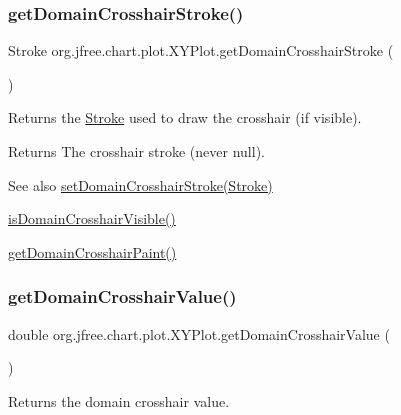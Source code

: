 \subsubsection{\texorpdfstring{get\+Domain\+Crosshair\+Stroke()}{getDomainCrosshairStroke()}}
{\footnotesize\ttfamily Stroke org.\+jfree.\+chart.\+plot.\+X\+Y\+Plot.\+get\+Domain\+Crosshair\+Stroke (\begin{DoxyParamCaption}{ }\end{DoxyParamCaption})}

Returns the \mbox{\hyperlink{}{Stroke}} used to draw the crosshair (if visible).

\begin{DoxyReturn}{Returns}
The crosshair stroke (never {\ttfamily null}).
\end{DoxyReturn}
\begin{DoxySeeAlso}{See also}
\mbox{\hyperlink{classorg_1_1jfree_1_1chart_1_1plot_1_1_x_y_plot_a6807ab7e31a792322c7fc3a3d387df77}{set\+Domain\+Crosshair\+Stroke(\+Stroke)}} 

\mbox{\hyperlink{classorg_1_1jfree_1_1chart_1_1plot_1_1_x_y_plot_ae1fc992f5b9f115943993c300b669c8d}{is\+Domain\+Crosshair\+Visible()}} 

\mbox{\hyperlink{classorg_1_1jfree_1_1chart_1_1plot_1_1_x_y_plot_a43a34d17324643826f1b1587e73fb38a}{get\+Domain\+Crosshair\+Paint()}} 
\end{DoxySeeAlso}
\mbox{\label{classorg_1_1jfree_1_1chart_1_1plot_1_1_x_y_plot_af89d596c34f4964a58156a7e83728536}} 
\subsubsection{\texorpdfstring{get\+Domain\+Crosshair\+Value()}{getDomainCrosshairValue()}}
{\footnotesize\ttfamily double org.\+jfree.\+chart.\+plot.\+X\+Y\+Plot.\+get\+Domain\+Crosshair\+Value (\begin{DoxyParamCaption}{ }\end{DoxyParamCaption})}

Returns the domain crosshair value.

